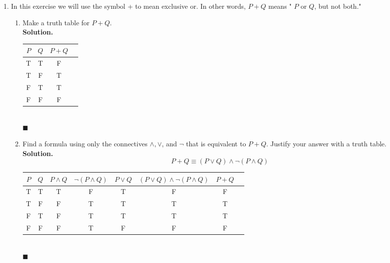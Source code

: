 \documentclass{report}
\newcommand{\sol}{\vspace{1em}\\\textbf{Solution.}\vspace{0.5em}}
\newcommand{\qed}{‎\\‎\hfill$\blacksquare$\vspace{1em}}
\begin{document}
\begin{enumerate}[leftmargin=*]
    \item In this exercise we will use the symbol + to mean exclusive or. In other words,
          $P+Q$ means " $P$ or $Q$, but not both."
          \begin{enumerate}
              \item Make a truth table for $P+Q$. \sol{}
                    \begin{center}
                        \begin{tabular}{cccc}
                            $P$ & $Q$ & $P+Q$ \\
                            \hline
                            T   & T   & F     \\
                            T   & F   & T     \\
                            F   & T   & T     \\
                            F   & F   & F
                        \end{tabular}
                    \end{center}\qed

              \item Find a formula using only the connectives $\wedge, \vee$, and $\neg$ that is
                    equivalent to $P+Q$. Justify your answer with a truth table. \sol{}
                    \[
                        P+Q \equiv (P \vee Q) \wedge \neg(P \wedge Q)
                    \]
                    \begin{center}
                        \begin{tabular}{cccccccc}
                            $P$ & $Q$ & $P \wedge Q$ & $\neg(P \wedge Q)$ & $P \vee Q$ & $(P \vee Q) \wedge \neg(P \wedge Q)$ & $P+Q$ \\
                            \hline
                            T   & T   & T            & F                  & T          & F                                    & F     \\
                            T   & F   & F            & T                  & T          & T                                    & T     \\
                            F   & T   & F            & T                  & T          & T                                    & T     \\
                            F   & F   & F            & T                  & F          & F                                    & F
                        \end{tabular}
                    \end{center}\qed
          \end{enumerate}


\end{enumerate}
\end{document}
